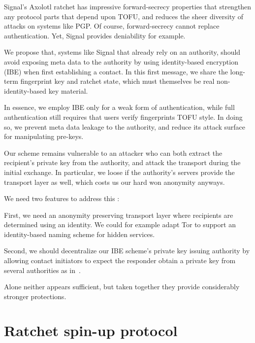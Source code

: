 \documentclass[twoside,letterpaper]{sig-alternate}
\begin{document}
Signal's Axolotl ratchet has impressive forward-secrecy properties
that strengthen any protocol parts that depend upon TOFU, and
reduces the sheer diversity of attacks on systems like PGP.
Of course, forward-secrecy cannot replace authentication.
Yet, Signal provides deniability for example.

\smallskip

We propose that, systems like Signal that already rely on an authority,
should avoid exposing meta data to the authority by using
identity-based encryption (IBE) when first establishing a contact.
In this first message, we share the long-term fingerprint key and
ratchet state, which must themselves be real non-identity-based key
material. 

In essence, we employ IBE only for a weak form of authentication, 
while full authentication still requires that users verify fingerprints
TOFU style.
In doing so, we prevent meta data leakage to the authority, and reduce
its attack surface for manipulating pre-keys.  

Our scheme remains vulnerable to an attacker who can both
 extract the recipient's private key from the authority, and
 attack the transport during the initial exchange.  
In particular, we loose if the authority's servers provide the transport
layer as well, which costs us our hard won anonymity anyways. 

We need two features to address this :

First, we need an anonymity preserving transport layer where recipients
are determined using an identity.  We could for example adapt Tor to
support an identity-based naming scheme for hidden services.  

Second, we should decentralize our IBE scheme's private key issuing
authority by allowing contact initiators to expect the responder
obtain a private key from several authorities as in~\cite{}. 

Alone neither appears sufficient, but taken together they provide 
considerably stronger protections. 


\section{Ratchet spin-up protocol}

\def\E{\mathbb{E}}
\def\F{\mathbb{F}}
\def\Z{\mathbb{Z}}
\def\ID{\mathtt{ID}}
\def\rk{\mathtt{rk}}
\def\ck{\mathtt{ck}}
\def\mk{\mathtt{mk}}
\end{document}
